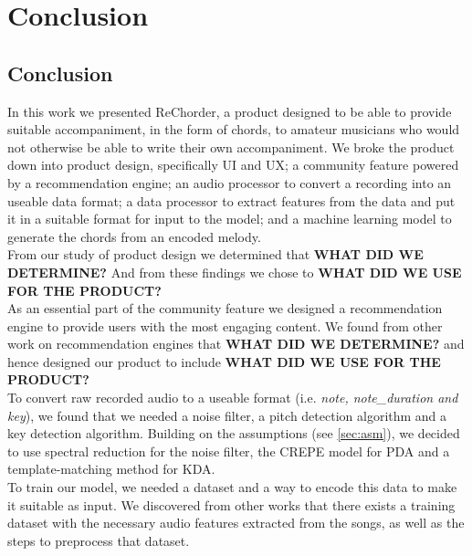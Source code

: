 


\chapter{Conclusion} %
\label{Conclusion} %

\section{Conclusion}

In this work we presented ReChorder, a product designed to be able to provide suitable accompaniment, in the form of chords, to amateur musicians who would not otherwise be able to write their own accompaniment.
We broke the product down into 
product design, specifically UI and UX; 
a community feature powered by a recommendation engine; 
an audio processor to convert a recording into an useable data format; 
a data processor to extract features from the data and put it in a suitable format for input to the model;
and a machine learning model to generate the chords from an encoded melody. 
\\
From our study of product design we determined that \textbf{WHAT DID WE DETERMINE?}
And from these findings we chose to \textbf{WHAT DID WE USE FOR THE PRODUCT?}
\\
As an essential part of the community feature we designed a recommendation engine to provide users with the most engaging content.
We found from other work on recommendation engines that  \textbf{WHAT DID WE DETERMINE?}
and hence designed our product to include \textbf{WHAT DID WE USE FOR THE PRODUCT?}
\\
To convert raw recorded audio to a useable format (i.e. \emph{note, note\_duration and key}), we found that we needed a noise filter, a pitch detection algorithm and a key detection algorithm. 
Building on the assumptions (see \cref{sec:asm}), we decided to use spectral reduction for the noise filter, the CREPE model for PDA and a template-matching method for KDA.
\\
To train our model, we needed a dataset and a way to encode this data to make it suitable as input. 
We discovered from other works that there exists a training dataset with the necessary audio features extracted from the songs, as well as the steps to preprocess that dataset. 
